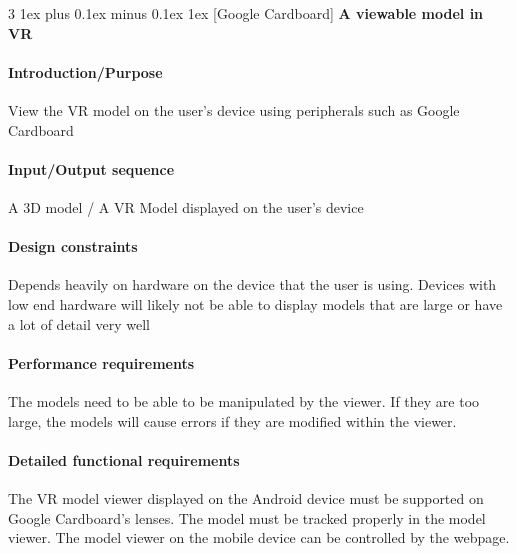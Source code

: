 \documentclass[letterpaper, 10pt, draftclsnofoot, compsoc, onecolumn]{IEEEtran}
\makeatletter
\def\subsubsection{\@startsection{subsubsection}%
                                 {3}%
                                 {\z@}%
                                 {1ex plus 0.1ex minus 0.1ex}%
                                 {1ex}%
                                 {\normalfont\normalsize}}%
\makeatother
\begin{document}

\subsubsection[{Google Cardboard}]{\rmfamily\bfseries\color{black} 
	A viewable model in VR 
}
\smallskip
\paragraph[Introduction/Purpose of this
feature]{\rmfamily\bfseries\color{black}
Introduction/Purpose }
	View the VR model on the user's device using peripherals such as Google Cardboard   

\paragraph[Input/Output sequence]{\rmfamily\bfseries\color{black}
Input/Output sequence }
	A 3D model / A VR Model displayed on the user's device  

\paragraph[Design constraints]{\rmfamily\bfseries\color{black} Design
constraints }
	Depends heavily on hardware on the device that the user is using. Devices with low end hardware will likely not be able to 
	display models that are large or have a lot of detail very well  

\paragraph[Performance requirements]{\rmfamily\bfseries\color{black}
Performance requirements }
	The models need to be able to be manipulated by the viewer. If they are too large, the models will cause errors if they are 
	modified within the viewer.  

\paragraph[Detailed functional requirements]{\rmfamily\bfseries\color{black}
Detailed functional requirements }
	The VR model viewer displayed on the Android device must be supported on Google Cardboard's lenses. The model must 
	be tracked properly in the model viewer. The model viewer on the mobile device can be controlled by the webpage.  
\end{document}
